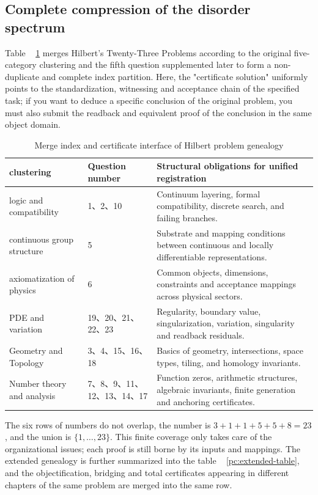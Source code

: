 \documentclass[11pt,a4paper]{article}
\theoremstyle{plain}
\theoremstyle{definition}
\theoremstyle{remark}
\begin{document}
\begin{CJK*}
\subsection { Complete compression of the disorder spectrum }

Table ~ \ref{pc:hilbert-table} merges Hilbert's Twenty-Three Problems according to the original five-category clustering and the fifth question supplemented later to form a non-duplicate and complete index partition. Here, the "certificate solution" uniformly points to the standardization, witnessing and acceptance chain of the specified task; if you want to deduce a specific conclusion of the original problem, you must also submit the readback and equivalent proof of the conclusion in the same object domain.

\begin{table}
[htbp] \centering \small \caption { Merge index and certificate interface of Hilbert problem genealogy }\label{pc:hilbert-table}
\begin{tabular}
{p{}p{}p{}}\hline
clustering&
Question number&
Structural obligations for unified registration\\
\hline
logic and compatibility&
1、2、10&
Continuum layering, formal compatibility, discrete search, and failing branches.\\
continuous group structure&
5&
Substrate and mapping conditions between continuous and locally differentiable representations.\\
axiomatization of physics&
6&
Common objects, dimensions, constraints and acceptance mappings across physical sectors.\\
PDE and variation&
19、20、21、22、23&
Regularity, boundary value, singularization, variation, singularity and readback residuals.\\
Geometry and Topology&
3、4、15、16、18&
Basics of geometry, intersections, space types, tiling, and homology invariants.\\
Number theory and analysis&
7、8、9、11、12、13、14、17&
Function zeros, arithmetic structures, algebraic invariants, finite generation and anchoring certificates.\\
\hline
\end{tabular}
\end{table}


The six rows of numbers do not overlap, the number is $3+1+1+5+5+8=23$, and the union is $\{1,\ldots,23\}$. This finite coverage only takes care of the organizational issues; each proof is still borne by its inputs and mappings. The extended genealogy is further summarized into the table ~ \ref{pc:extended-table}, and the objectification, bridging and total certificates appearing in different chapters of the same problem are merged into the same row.


\end{CJK*}
\end{document}
